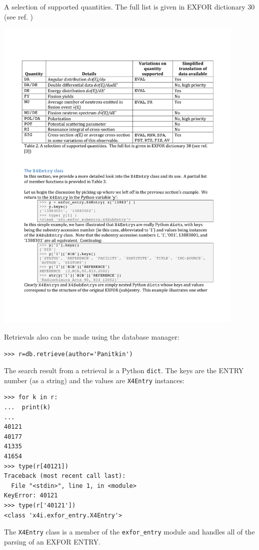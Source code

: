 \documentclass[11pt]{article}
\begin{document}
\begin{table}
\caption{A selection of supported quantities.  The full list is given in EXFOR dictionary 30 (see ref. \cite{3})}
\begin{center}
\includegraphics[width=0.9\textwidth]{tables/table2}
\end{center}
\label{table:observables}
\end{table}%


Retrievals also can be made using the database manager:
\begin{verbatim}
>>> r=db.retrieve(author='Panitkin')
\end{verbatim}
The search result from a retrieval is a Python \texttt{dict}.  The keys are the ENTRY number (as a string) and the values are \texttt{X4Entry} instances:
\begin{verbatim}
>>> for k in r:
...  print(k)
...
40121
40177
41335
41654
>>> type(r[40121])
Traceback (most recent call last):
  File "<stdin>", line 1, in <module>
KeyError: 40121
>>> type(r['40121'])
<class 'x4i.exfor_entry.X4Entry'>
\end{verbatim}
The \texttt{X4Entry} class is a member of the \texttt{exfor\_entry} module and handles all of the parsing of an EXFOR ENTRY.
\end{document}
